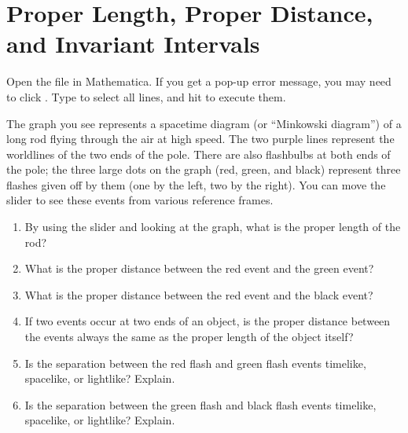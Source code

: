 \section{Proper Length, Proper Distance, and Invariant Intervals}

\makelabheader %

\bigskip

Open the file  in Mathematica. If you get a pop-up error message, you may need to click . Type  to select all lines, and hit  to execute them.

The graph you see represents a spacetime diagram (or ``Minkowski diagram'') of a long rod flying through the air at high speed. The two purple lines represent the worldlines of the two ends of the pole. There are also flashbulbs at both ends of the pole; the three large dots on the graph (red, green, and black) represent three flashes given off by them (one by the left, two by the right). You can move the slider to see these events from various reference frames.

\begin{enumerate}[wide]
\item By using the slider and looking at the graph, what is the proper length of the rod?
\answerspace{0.7in}

\item What is the proper distance between the red event and the green event?
\answerspace{0.7in}

\item What is the proper distance between the red event and the black event?
\answerspace{0.7in}

\item If two events occur at two ends of an object, is the proper distance between the events always the same as the proper length of the object itself?
\answerspace{0.7in}

\item Is the separation between the red flash and green flash events timelike, spacelike, or lightlike?  Explain.
\answerspace{0.8in}

\item Is the separation between the green flash and black flash events timelike, spacelike, or lightlike?  Explain.
\answerspace{0.8in}

\end{enumerate}
